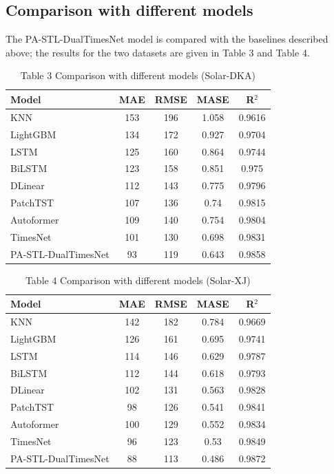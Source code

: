 \documentclass{iopjournal}
\begin{document}
\subsection{Comparison with different models}

The PA-STL-DualTimesNet model is compared with the baselines described above; the results for the two datasets are given in Table 3 and Table 4.

\begin{table}[htbp]
\caption{Table 3  Comparison with different models (Solar-DKA)}
\centering
\begin{tabular}{l c c c c}
\hline
Model & MAE & RMSE & MASE & R$^2$ \\
\hline
KNN & 153 & 196 & 1.058 & 0.9616 \\
LightGBM & 134 & 172 & 0.927 & 0.9704 \\
LSTM & 125 & 160 & 0.864 & 0.9744 \\
BiLSTM & 123 & 158 & 0.851 & 0.975 \\
DLinear & 112 & 143 & 0.775 & 0.9796 \\
PatchTST & 107 & 136 & 0.74 & 0.9815 \\
Autoformer & 109 & 140 & 0.754 & 0.9804 \\
TimesNet & 101 & 130 & 0.698 & 0.9831 \\
PA-STL-DualTimesNet & 93 & 119 & 0.643 & 0.9858 \\
\hline
\end{tabular}
\label{tab3}
\end{table}

\begin{table}[htbp]
\caption{Table 4  Comparison with different models (Solar-XJ)}
\centering
\begin{tabular}{l c c c c}
\hline
Model & MAE & RMSE & MASE & R$^2$ \\
\hline
KNN & 142 & 182 & 0.784 & 0.9669 \\
LightGBM & 126 & 161 & 0.695 & 0.9741 \\
LSTM & 114 & 146 & 0.629 & 0.9787 \\
BiLSTM & 112 & 144 & 0.618 & 0.9793 \\
DLinear & 102 & 131 & 0.563 & 0.9828 \\
PatchTST & 98 & 126 & 0.541 & 0.9841 \\
Autoformer & 100 & 129 & 0.552 & 0.9834 \\
TimesNet & 96 & 123 & 0.53 & 0.9849 \\
PA-STL-DualTimesNet & 88 & 113 & 0.486 & 0.9872 \\
\hline
\end{tabular}
\label{tab4}
\end{table}
\end{document}
